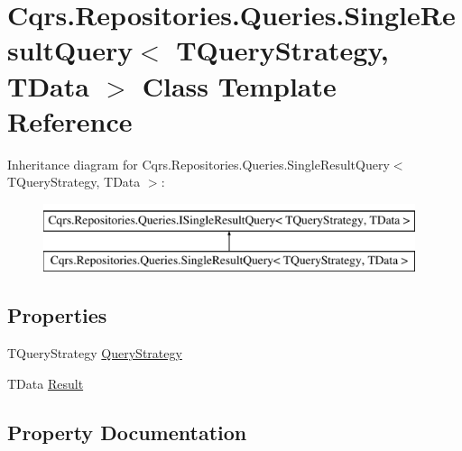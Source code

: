 \hypertarget{classCqrs_1_1Repositories_1_1Queries_1_1SingleResultQuery}{}\section{Cqrs.\+Repositories.\+Queries.\+Single\+Result\+Query$<$ T\+Query\+Strategy, T\+Data $>$ Class Template Reference}
\label{classCqrs_1_1Repositories_1_1Queries_1_1SingleResultQuery}
Inheritance diagram for Cqrs.\+Repositories.\+Queries.\+Single\+Result\+Query$<$ T\+Query\+Strategy, T\+Data $>$\+:\begin{figure}[H]
\begin{center}
\leavevmode
\includegraphics[height=2.000000cm]{classCqrs_1_1Repositories_1_1Queries_1_1SingleResultQuery}
\end{center}
\end{figure}
\subsection*{Properties}
\begin{DoxyCompactItemize}
\item 
T\+Query\+Strategy \hyperlink{classCqrs_1_1Repositories_1_1Queries_1_1SingleResultQuery_aed8abf985add794371490fc8e66ed628}{Query\+Strategy}
\item 
T\+Data \hyperlink{classCqrs_1_1Repositories_1_1Queries_1_1SingleResultQuery_a8ec51fe4bb5f1c9f1f62abdf9cf7c370}{Result}
\end{DoxyCompactItemize}


\subsection{Property Documentation}
\mbox{\label{classCqrs_1_1Repositories_1_1Queries_1_1SingleResultQuery_aed8abf985add794371490fc8e66ed628}} 
